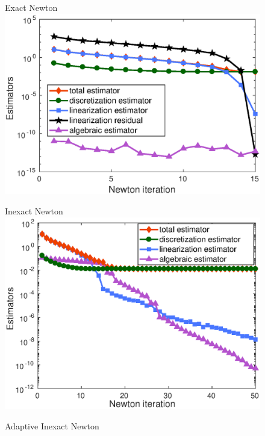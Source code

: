 \documentclass{beamer}
\begin{document}
\begin{frame}
\vspace{-0.3 cm}
\begin{figure}
   \begin{minipage}[c]{.33\linewidth}
   \centering
   Exact  Newton 
\includegraphics[width=\textwidth]{fig_article/exact_resolution_estimators_newton_iter_Hmax_015.eps}    
   \end{minipage} \hfill
   \begin{minipage}[c]{.33\linewidth}
   \centering
   Inexact Newton
\includegraphics[width=\textwidth]{fig_article/inexacte_resolution_Hmax_015_estimators_newton_step.eps}     
   \end{minipage} \hfill
  \begin{minipage}[c]{.32\linewidth}
  \centering
  Adaptive Inexact Newton  

\end{minipage}
\end{figure}
\end{frame}
\end{document}
